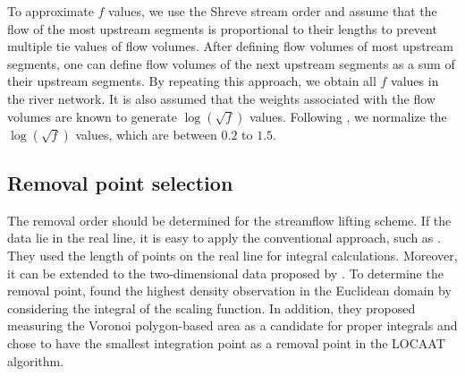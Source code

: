 \documentclass[11pt,titlepage]{article}
\begin{document}
To approximate $f$ values, we use the Shreve stream order and assume that the flow of the most upstream segments is  proportional to their lengths to prevent multiple tie values of flow volumes. After defining flow volumes of most upstream segments, one can define flow volumes of the next upstream segments as a sum of their upstream segments. By repeating this approach, we obtain all $f$ values in the river network. It is also assumed that the weights associated with the flow volumes are known to generate $\log(\sqrt{f})$ values. Following \cite{ODonnell2014}, we normalize the $\log(\sqrt{f})$ values, which are  between $0.2$ to $1.5$.
			
\subsection{Removal point selection}

The removal order should be determined for the streamflow lifting scheme. If the data lie in the real line, it is easy to apply the conventional approach, such as  \cite{Nunes2006}. They used the length of points on the real line for integral calculations. Moreover, it can be extended to the two-dimensional data proposed by \cite{Jansen2009}. To determine the removal point, \cite{Jansen2009} found the highest density observation in the Euclidean domain by considering the integral of the scaling function. In addition, they proposed measuring the Voronoi polygon-based area as a candidate for proper integrals and chose to have the smallest integration point as a removal point in the LOCAAT algorithm.
\end{document}
